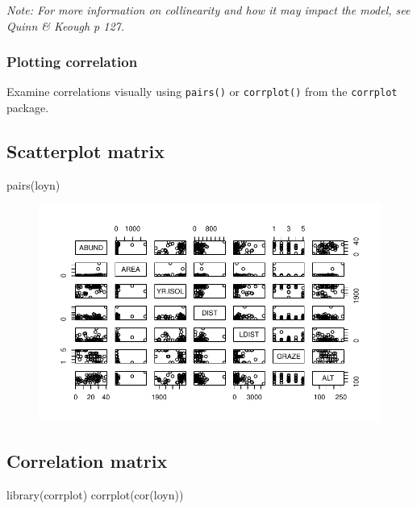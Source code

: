 \documentclass[
  10pt,
  letterpaper,
  DIV=11,
  numbers=noendperiod]{scrartcl}
\newenvironment{Shaded}{\begin{snugshade}}{\end{snugshade}}
\newcommand{\FunctionTok}[1]{\textcolor[rgb]{0.28,0.35,0.67}{#1}}
\newcommand{\NormalTok}[1]{\textcolor[rgb]{0.00,0.23,0.31}{#1}}
\begin{document}
\emph{Note: For more information on collinearity and how it may impact
the model, see Quinn \& Keough p 127.}

\hypertarget{plotting-correlation}{%
\subsubsection{Plotting correlation}\label{plotting-correlation}}

Examine correlations visually using \texttt{pairs()} or
\texttt{corrplot()} from the \texttt{corrplot} package.

\subsection{Scatterplot matrix}

\begin{Shaded}
\begin{Highlighting}[]
\FunctionTok{pairs}\NormalTok{(loyn)}
\end{Highlighting}
\end{Shaded}

\begin{figure}[H]

{\centering \includegraphics{ENVX2001-2024-Lab07_files/figure-pdf/unnamed-chunk-7-1.pdf}

}

\end{figure}

\subsection{Correlation matrix}

\begin{Shaded}
\begin{Highlighting}[]
\FunctionTok{library}\NormalTok{(corrplot)}
\FunctionTok{corrplot}\NormalTok{(}\FunctionTok{cor}\NormalTok{(loyn))}
\end{Highlighting}
\end{Shaded}
\end{document}
